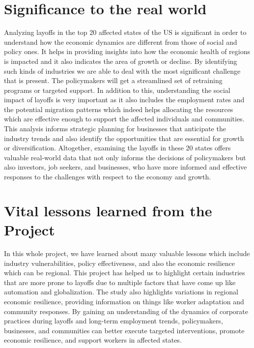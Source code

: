 
\section{\Large \textbf{Significance to the real world}}
{ Analyzing layoffs in the top 20 affected states of the US is significant in order to understand how the economic dynamics are different from those of social and policy ones. It helps in providing insights into how the economic health of regions is impacted and it also indicates the area of growth or decline. By identifying such kinds of industries we are able to deal with the most significant challenge that is present. The policymakers will get a streamlined set of retraining programs or targeted support. In addition to this, understanding the social impact of layoffs is very important as it also includes the employment rates and the potential migration patterns which indeed helps allocating the resources which are effective enough to support the affected individuals and communities. This analysis informs strategic planning for businesses that anticipate the industry trends and also identify the opportunities that are essential for growth or diversification. Altogether, examining the layoffs in these 20 states offers valuable real-world data that not only informs the decisions of policymakers but also investors, job seekers, and businesses, who have more informed and effective responses to the challenges with respect to the economy and growth.
}
\section{\Large \textbf{Vital lessons learned from the Project}}
{In this whole project, we have learned about many valuable lessons which include industry vulnerabilities, policy effectiveness, and also the economic resilience which can be regional. This project has helped us to highlight certain industries that are more prone to layoffs due to multiple factors that have come up like automation and globalization. The study also highlights variations in regional economic resilience, providing information on things like worker adaptation and community responses. By gaining an understanding of the dynamics of corporate practices during layoffs and long-term employment trends, policymakers, businesses, and communities can better execute targeted interventions, promote economic resilience, and support workers in affected states.
}

